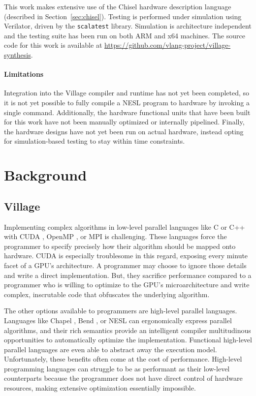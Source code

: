 \documentclass[sigconf, nonacm]{acmart}
\begin{document}
This work makes extensive use of the Chisel hardware description language (described in Section~\ref{sec:chisel}).
Testing is performed under simulation using Verilator, driven by the \texttt{scalatest} library.
Simulation is architecture independent and the testing suite has been run on both ARM and x64 machines.
The source code for this work is available at \url{https://github.com/vlang-project/village-synthesis}.

\paragraph{Limitations}

Integration into the Village compiler and runtime has not yet been completed, so it is not yet possible to fully compile a NESL program to hardware by invoking a single command.
Additionally, the hardware functional units that have been built for this work have not been manually optimized or internally pipelined.
Finally, the hardware designs have not yet been run on actual hardware, instead opting for simulation-based testing to stay within time constraints.



\section{Background}


\subsection{Village}
\label{sec:village}

Implementing complex algorithms in low-level parallel languages like C or C++ with CUDA \cite{NVIDIA:CUDA:Manual}, OpenMP \cite{dagum1998openmp}, or MPI \cite{MPI-SPEC-09} is challenging.
These languages force the programmer to specify precisely how their algorithm should be mapped onto hardware.
CUDA is especially troublesome in this regard, exposing every minute facet of a GPU's architecture.
A programmer may choose to ignore those details and write a direct implementation.
But, they sacrifice performance compared to a programmer who is willing to optimize to the GPU's microarchitecture and write complex, inscrutable code that obfuscates the underlying algorithm.

The other options available to programmers are high-level parallel languages.
Languages like Chapel \cite{chamberlain2015chapel}, Bend \cite{bend-hvm2}, or NESL \cite{BLELLOCH-NESL-JPDC94, BLELLOCH-NSEL-ICFP96} can ergonomically express parallel algorithms, and their rich semantics provide an intelligent compiler multitudinous opportunities to automatically optimize the implementation.
Functional high-level parallel languages are even able to abstract away the execution model.
Unfortunately, these benefits often come at the cost of performance.
High-level programming languages can struggle to be as performant as their low-level counterparts because the programmer does not have direct control of hardware resources, making extensive optimization essentially impossible.
\end{document}
